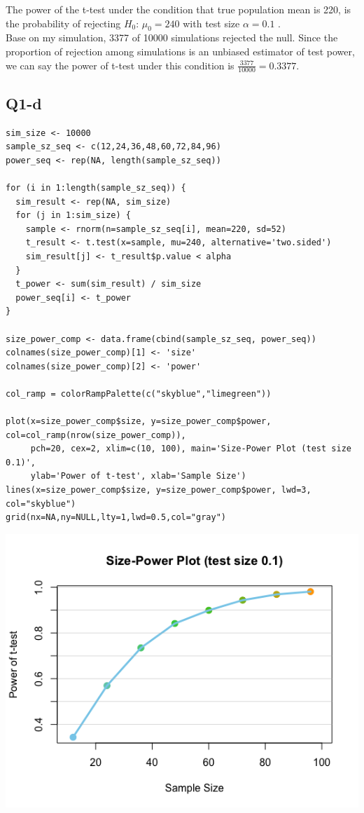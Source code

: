 \documentclass[12pt,letterpaper]{article}
\begin{document}
\noindent The power of the t-test under the condition that true population mean is 220, is the probability of rejecting $H_0$: $\mu_0 = 240$ with test size $\alpha = 0.1$ . \\

\noindent Base on my simulation, 3377 of 10000 simulations rejected the null. Since the proportion of rejection among simulations is an unbiased estimator of test power, we can say the power of t-test under this condition is $\frac{3377}{10000} = 0.3377$.

\newpage
\subsection*{Q1-d}
\begin{verbatim}
sim_size <- 10000
sample_sz_seq <- c(12,24,36,48,60,72,84,96)
power_seq <- rep(NA, length(sample_sz_seq))

for (i in 1:length(sample_sz_seq)) {
  sim_result <- rep(NA, sim_size)
  for (j in 1:sim_size) {
    sample <- rnorm(n=sample_sz_seq[i], mean=220, sd=52)
    t_result <- t.test(x=sample, mu=240, alternative='two.sided')
    sim_result[j] <- t_result$p.value < alpha
  }
  t_power <- sum(sim_result) / sim_size
  power_seq[i] <- t_power
}

size_power_comp <- data.frame(cbind(sample_sz_seq, power_seq))
colnames(size_power_comp)[1] <- 'size'
colnames(size_power_comp)[2] <- 'power'

col_ramp = colorRampPalette(c("skyblue","limegreen"))

plot(x=size_power_comp$size, y=size_power_comp$power, col=col_ramp(nrow(size_power_comp)),
     pch=20, cex=2, xlim=c(10, 100), main='Size-Power Plot (test size 0.1)', 
     ylab='Power of t-test', xlab='Sample Size')
lines(x=size_power_comp$size, y=size_power_comp$power, lwd=3, col="skyblue")
grid(nx=NA,ny=NULL,lty=1,lwd=0.5,col="gray")
\end{verbatim}

\includegraphics[width=150mm]{size-power.png}
\end{document}
